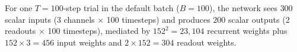 \documentclass[11pt]{article}
\begin{document}
For one $T=100$-step trial in the default batch ($B=100$), the network
sees $300$ scalar inputs (3 channels $\times$ 100 timesteps) and
produces $200$ scalar outputs (2 readouts $\times$ 100 timesteps),
mediated by $152^{2}=23{,}104$ recurrent weights plus
$152\times 3=456$ input weights and $2\times 152=304$ readout weights.
\end{document}
